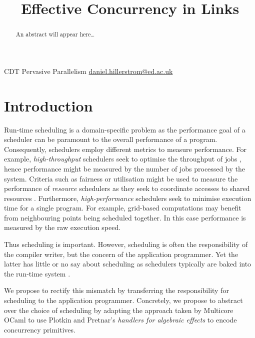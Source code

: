\documentclass[preprint,10pt,numbers]{sigplanconf}
\begin{document}
\title{Effective Concurrency in Links}

           {CDT Pervasive Parallelism}
           {\href{mailto:daniel.hillerstrom@ed.ac.uk}{daniel.hillerstrom@ed.ac.uk}}
  \maketitle
  \begin{abstract}
    An abstract will appear here\dots
  \end{abstract}
  \raggedbottom
  \section{Introduction}
Run-time scheduling is a domain-specific problem as the performance goal of a scheduler can be paramount to the overall performance of a program. Consequently, schedulers employ different metrics to measure performance. For example, \emph{high-throughput} schedulers seek to optimise the throughput of jobs \cite{Berman2003}, hence performance might be measured by the number of jobs processed by the system. Criteria such as fairness or utilisation might be used to measure the performance of \emph{resource} schedulers as they seek to coordinate accesses to shared resources \cite{Berman2003}. Furthermore, \emph{high-performance} schedulers seek to minimise execution time for a single program. For example, grid-based computations may benefit from neighbouring points being scheduled together. In this case performance is measured by the raw execution speed.

Thus scheduling is important. However, scheduling is often the responsibility of the compiler writer, but the concern of the application programmer. Yet the latter has little or no say about scheduling as schedulers typically are baked into the run-time system \cite{Dolan2015}. 

We propose to rectify this mismatch by transferring the responsibility for scheduling to the application programmer. Concretely, we propose to abstract over the choice of scheduling by adapting the approach taken by Multicore OCaml \cite{Dolan2015} to use Plotkin and Pretnar's \emph{handlers for algebraic effects} \cite{Plotkin2013} to encode concurrency primitives.

\end{document}
